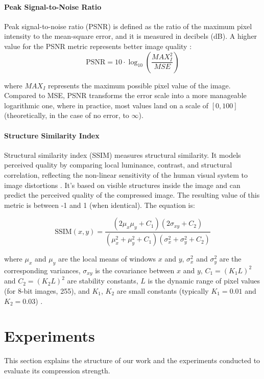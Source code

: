 \documentclass[conference]{IEEEtran}
\begin{document}
\paragraph{Peak Signal-to-Noise Ratio}
Peak signal-to-noise ratio (PSNR) is defined as the ratio of the maximum pixel intensity to the mean-square error, and it is measured in decibels (dB). A higher value for the PSNR metric represents better image quality \cite{ungureanu_image-compression_2024}:
\begin{equation}
    \text{PSNR} = 10 \cdot \log_{10} \left( \frac{MAX_I^2}{MSE} \right)
\end{equation}

where $MAX_I$ represents the maximum possible pixel value of the image. Compared to MSE, PSNR transforms the error scale into a more manageable logarithmic one, where in practice, most values land on a scale of $[0, 100]$ (theoretically, in the case of no error, to $\infty$).

\paragraph{Structure Similarity Index}
Structural similarity index (SSIM) measures structural similarity. It models perceived quality by comparing local luminance, contrast, and structural correlation, reflecting the non-linear sensitivity of the human visual system to image distortions \cite{cheng_deep_2018}. It's based on visible structures inside the image and can predict the perceived quality of the compressed image. 
The resulting value of this metric is between -1 and 1 (when identical). The equation is:

\begin{equation}
\mathrm{SSIM}(x,y) =
\frac{(2\mu_x \mu_y + C_1)(2\sigma_{xy} + C_2)}
     {(\mu_x^2 + \mu_y^2 + C_1)(\sigma_x^2 + \sigma_y^2 + C_2)}
\end{equation}

where $\mu_x$ and $\mu_y$ are the local means of windows $x$ and $y$, 
$\sigma_x^2$ and $\sigma_y^2$ are the corresponding variances, 
$\sigma_{xy}$ is the covariance between $x$ and $y$, 
$C_1 = (K_1 L)^2$ and $C_2 = (K_2 L)^2$ are stability constants, 
$L$ is the dynamic range of pixel values (for 8-bit images, 255), 
and $K_1$, $K_2$ are small constants (typically $K_1=0.01$ and $K_2=0.03$) \cite{ungureanu_image-compression_2024}.

\section{Experiments}
This section explains the structure of our work and the experiments conducted to evaluate its compression strength.
\end{document}
